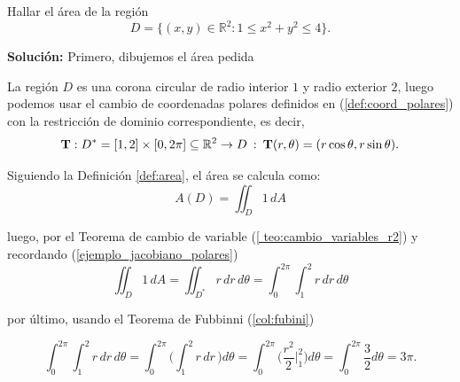 \begin{example}
Hallar el área de la región
\[
D = \{(x,y) \in \mathbb{R}^2 : 1 \leq x^2 + y^2 \leq 4\}.
\]
\end{example}

\textbf{Soluci\'on:} Primero, dibujemos el \'area pedida 

\begin{figure}[htbp]
    \centering
     
    \label{fig:ejemplo polares}
\end{figure}

La región $D$ es una corona circular de radio interior $1$ y radio exterior $2$, luego podemos usar el cambio de coordenadas polares definidos en (\ref{def:coord_polares}) con la restricci\'on de dominio correspondiente, es decir, 
 \begin{equation*}
\mathbf{T}:D^*=[1,2] \times[0, 2\pi] \subseteq\mathbb{R}^2 \to D\: : \: \mathbf{T}(r, \theta ) =( r \cos \theta , r \sin \theta ).
\end{equation*} 

Siguiendo la Definición \ref{def:area}, el área se calcula como:
\begin{equation*}
A(D) = \iint_D 1\, dA
\end{equation*}

luego, por el Teorema de cambio de variable  (\ref{ teo:cambio_variables_r2}) y recordando (\ref{ejemplo_jacobiano_polares}) 
$$ \iint_D 1\, dA = \iint_{D^*} r\, dr\, d\theta= \int_0^{2\pi} \int_1^2 r\, dr\, d\theta $$ 

 por \'ultimo, usando  el Teorema de Fubbinni  (\ref{col:fubini}) 

\begin{equation*}
\int_0^{2\pi} \int_1^2 r\, dr\, d\theta = \int_0^{2\pi} \Big(  \int_1^2 r\, dr\,  \Big) d\theta  =  \int_0^{2\pi}  \Big( \frac{r^2}{2}\Big|_1^2 \Big)  d\theta  = \int_0^{2\pi}  \frac{3}{2}  d\theta =3\pi.
\end{equation*}



